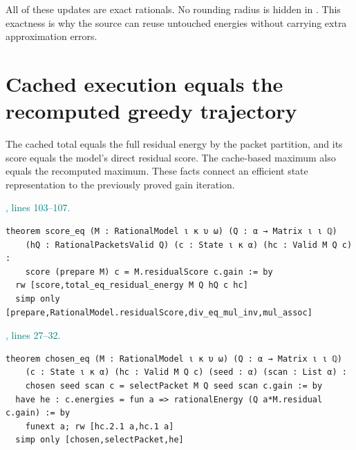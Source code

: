 \documentclass[11pt]{article}\usepackage{needspace}\renewcommand{\paperkind}{Lean companion}\setlength{\parskip}{0.35em}
\begin{document}
All of these updates are exact rationals. No rounding radius is hidden in . This exactness is why the source can reuse untouched energies without carrying extra approximation errors.

\section{Cached execution equals the recomputed greedy trajectory}

The cached total equals the full residual energy by the packet partition, and its score equals the model's direct residual score. The cache-based maximum also equals the recomputed maximum. These facts connect an efficient state representation to the previously proved gain iteration.



{\small\textcolor{teal}{, lines 103--107.}\par}

\begin{lstlisting}[style=BayesSource]
theorem score_eq (M : RationalModel ι κ υ ω) (Q : α → Matrix ι ι ℚ)
    (hQ : RationalPacketsValid Q) (c : State ι κ α) (hc : Valid M Q c) :
    score (prepare M) c = M.residualScore c.gain := by
  rw [score,total_eq_residual_energy M Q hQ c hc]
  simp only [prepare,RationalModel.residualScore,div_eq_mul_inv,mul_assoc]
\end{lstlisting}



{\small\textcolor{teal}{, lines 27--32.}\par}

\begin{lstlisting}[style=BayesSource]
theorem chosen_eq (M : RationalModel ι κ υ ω) (Q : α → Matrix ι ι ℚ)
    (c : State ι κ α) (hc : Valid M Q c) (seed : α) (scan : List α) :
    chosen seed scan c = selectPacket M Q seed scan c.gain := by
  have he : c.energies = fun a => rationalEnergy (Q a*M.residual c.gain) := by
    funext a; rw [hc.2.1 a,hc.1 a]
  simp only [chosen,selectPacket,he]
\end{lstlisting}
\end{document}
